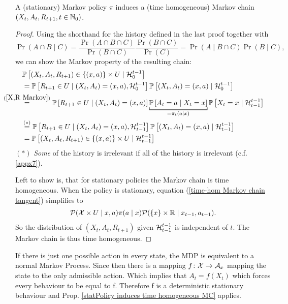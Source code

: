 \begin{prop}\label{statPolicy induces time homogeneous MC}
	A (stationary) Markov  policy \(\pi\) induces a (time homogeneous) Markov chain \((X_t,A_t,R_{t+1},t\in\mathbb{N}_0)\).
\end{prop}
\begin{proof} 

	Using the shorthand for the history defined in the last proof together with 
	\[
		\Pr(A\cap B \mid C)
		=\frac{\Pr(A\cap B\cap C)}{\Pr(B\cap C)}\frac{\Pr(B\cap C)}{\Pr(C)} 
		= \Pr(A\mid B\cap C)\Pr(B\mid C),
	\]
	we can show the Markov property of the resulting chain:
	\begin{align}
		&\Pr\left[(X_t,A_t,R_{t+1})\in\{(x,a)\}\times U \mid \cH_0^{t-1} \right] \nonumber \\
		&=\Pr\left[R_{t+1}\in U \mid (X_t, A_t)=(x,a), \cH_0^{t-1}\right]
		\Pr\left[(X_t, A_t)=(x,a)\mid\cH_0^{t-1}\right]
		\nonumber\\
		&\lxeq{(\ref{X,R Markov})}\Pr\left[R_{t+1}\in U \mid (X_t, A_t)=(x,a)\right]
		\underbracket[0.7pt]{\Pr\left[A_t=a \mid X_t=x\right]}_{=\pi_t(a\mid x)}
		\Pr\left[X_t=x\mid \cH_{t-1}^{t-1}\right]
		\label{time-hom Markov chain tangent}\\
		&\lxeq{(*)}\Pr\left[R_{t+1}\in U \mid (X_t, A_t)=(x,a), \cH_{t-1}^{t-1}\right]
		\Pr\left[(X_t, A_t)=(x,a)\mid\cH_{t-1}^{t-1}\right]
		\nonumber\\
		&=\Pr\left[(X_t,A_t,R_{t+1})\in\{(x,a)\}\times U \mid \cH_{t-1}^{t-1} \right]
		\nonumber
	\end{align}
	\((*)\) \emph{Some} of the history is irrelevant if all of the history is irrelevant (c.f. \ref{appx7}).
	
	Left to show is, that for stationary policies the Markov chain is time homogeneous. When the policy is stationary, equation (\ref{time-hom Markov chain tangent}) simplifies to
	\begin{align*}
		\mathcal{P}(\mathcal{X}\times U \mid x,a)\pi(a\mid x)
		\mathcal{P}(\{x\}\times \mathbb{R} \mid x_{t-1}, a_{t-1}).
	\end{align*}
	So the distribution of \((X_{t},A_{t},R_{t+1})\) given \(\mathcal{H}^{t-1}_{t-1}\) is independent of \(t\). The Markov chain is thus time homogeneous.
\end{proof} 
\begin{remark} 
If there is just one possible action in every state, the MDP is equivalent to a normal Markov Process. 
Since then there is a mapping \(f\colon\mathcal{X}\to\mathcal{A}_x\) mapping the state to  the only admissible action. Which implies that \(A_t=f(X_t)\) which forces every behaviour to be equal to f. Therefore f is a deterministic stationary behaviour and Prop. \ref{statPolicy induces time homogeneous MC} applies.  
\end{remark}

